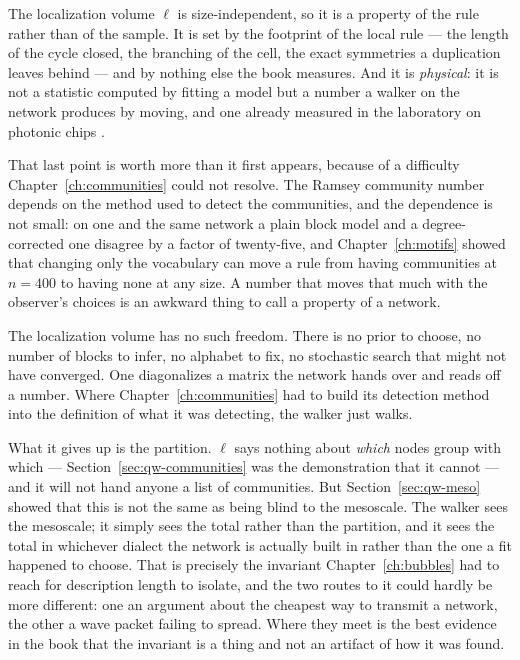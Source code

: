 The localization volume $\ell$ is size-independent, so it is a property of the rule
rather than of the sample. It is set by the footprint of the local rule --- the
length of the cycle closed, the branching of the cell, the exact symmetries a
duplication leaves behind --- and by nothing else the book measures. And it is
\emph{physical}: it is not a statistic computed by fitting a model but a number a
walker on the network produces by moving, and one already measured in the laboratory
on photonic chips \citep{tang2018}.

That last point is worth more than it first appears, because of a difficulty
Chapter~\ref{ch:communities} could not resolve. The Ramsey community number depends
on the method used to detect the communities, and the dependence is not small: on
one and the same network a plain block model and a degree-corrected one disagree by
a factor of twenty-five, and Chapter~\ref{ch:motifs} showed that changing only the
vocabulary can move a rule from having communities at $n=400$ to having none at any
size. A number that moves that much with the observer's choices is an awkward thing
to call a property of a network.

The localization volume has no such freedom. There is no prior to choose, no number
of blocks to infer, no alphabet to fix, no stochastic search that might not have
converged. One diagonalizes a matrix the network hands over and reads off a number.
Where Chapter~\ref{ch:communities} had to build its detection method into the
definition of what it was detecting, the walker just walks.

What it gives up is the partition. $\ell$ says nothing about \emph{which} nodes group
with which --- Section~\ref{sec:qw-communities} was the demonstration that it cannot
--- and it will not hand anyone a list of communities. But
Section~\ref{sec:qw-meso} showed that this is not the same as being blind to the
mesoscale. The walker sees the mesoscale; it simply sees the total rather than the
partition, and it sees the total in whichever dialect the network is actually built
in rather than the one a fit happened to choose. That is precisely the invariant
Chapter~\ref{ch:bubbles} had to reach for description length to isolate, and the two
routes to it could hardly be more different: one an argument about the cheapest way
to transmit a network, the other a wave packet failing to spread. Where they meet is
the best evidence in the book that the invariant is a thing and not an artifact of
how it was found.

